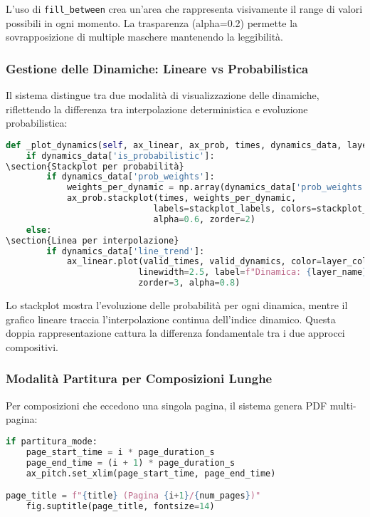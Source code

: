 L'uso di \texttt{fill\_between} crea un'area che rappresenta visivamente il range di valori possibili in ogni momento. La trasparenza (alpha=0.2) permette la sovrapposizione di multiple maschere mantenendo la leggibilità.
\subsubsection{Gestione delle Dinamiche: Lineare vs Probabilistica}
Il sistema distingue tra due modalità di visualizzazione delle dinamiche, riflettendo la differenza tra interpolazione deterministica e evoluzione probabilistica:

\begin{lstlisting}[language=Python]
def _plot_dynamics(self, ax_linear, ax_prob, times, dynamics_data, layer_color, layer_name):
    if dynamics_data['is_probabilistic']:
\section{Stackplot per probabilità}
        if dynamics_data['prob_weights']:
            weights_per_dynamic = np.array(dynamics_data['prob_weights']).T
            ax_prob.stackplot(times, weights_per_dynamic, 
                             labels=stackplot_labels, colors=stackplot_colors,
                             alpha=0.6, zorder=2)
    else:
\section{Linea per interpolazione}
        if dynamics_data['line_trend']:
            ax_linear.plot(valid_times, valid_dynamics, color=layer_color, 
                          linewidth=2.5, label=f"Dinamica: {layer_name}", 
                          zorder=3, alpha=0.8)
\end{lstlisting}

Lo stackplot mostra l'evoluzione delle probabilità per ogni dinamica, mentre il grafico lineare traccia l'interpolazione continua dell'indice dinamico. Questa doppia rappresentazione cattura la differenza fondamentale tra i due approcci compositivi.
\subsubsection{Modalità Partitura per Composizioni Lunghe}
Per composizioni che eccedono una singola pagina, il sistema genera PDF multi-pagina:

\begin{lstlisting}[language=Python]
if partitura_mode:
    page_start_time = i * page_duration_s
    page_end_time = (i + 1) * page_duration_s
    ax_pitch.set_xlim(page_start_time, page_end_time)

page_title = f"{title} (Pagina {i+1}/{num_pages})"
    fig.suptitle(page_title, fontsize=14)
\end{lstlisting}

